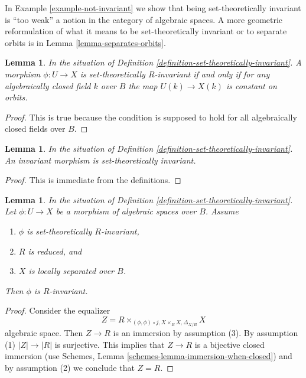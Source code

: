 \documentclass{stacks-project}
\theoremstyle{plain}
\newtheorem{lemma}[subsection]{Lemma}
\theoremstyle{definition}
\theoremstyle{remark}
\numberwithin{equation}{subsection}
\begin{document}
\noindent
In
Example \ref{example-not-invariant}
we show that being set-theoretically invariant is ``too weak'' a notion in
the category of algebraic spaces. A more geometric reformulation
of what it means to be set-theoretically invariant or to separate orbits is in
Lemma \ref{lemma-separates-orbits}.

\begin{lemma}
\label{lemma-set-theoretic-invariant}
In the situation of Definition \ref{definition-set-theoretically-invariant}.
A morphism $\phi : U \to X$ is set-theoretically $R$-invariant if and
only if for any algebraically closed field $k$ over $B$ the map
$U(k) \to X(k)$ is constant on orbits.
\end{lemma}

\begin{proof}
This is true because the condition is supposed to hold for all algebraically
closed fields over $B$.
\end{proof}

\begin{lemma}
\label{lemma-invariant-set-theoretically-invariant}
In the situation of Definition \ref{definition-set-theoretically-invariant}.
An invariant morphism is set-theoretically invariant.
\end{lemma}

\begin{proof}
This is immediate from the definitions.
\end{proof}

\begin{lemma}
\label{lemma-set-theoretically-invariant-invariant-when-reduced}
In the situation of Definition \ref{definition-set-theoretically-invariant}.
Let $\phi : U \to X$ be a morphism of algebraic spaces over $B$.
Assume
\begin{enumerate}
\item $\phi$ is set-theoretically $R$-invariant,
\item $R$ is reduced, and
\item $X$ is locally separated over $B$.
\end{enumerate}
Then $\phi$ is $R$-invariant.
\end{lemma}

\begin{proof}
Consider the equalizer
$$
Z = R \times_{(\phi, \phi) \circ j, X \times_B X, \Delta_{X/B}} X
$$
algebraic space. Then $Z \to R$ is an immersion by assumption (3).
By assumption (1) $|Z| \to |R|$ is surjective. This implies that
$Z \to R$ is a bijective closed immersion (use
Schemes, Lemma \ref{schemes-lemma-immersion-when-closed})
and by assumption (2) we conclude that $Z = R$.
\end{proof}
\end{document}
